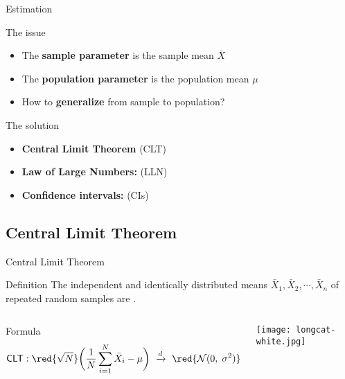 \documentclass[t]{beamer}
\begin{document}
	\begin{frame}[t]{Estimation}

		\begin{block}{The issue}
			\begin{itemize}
				\item The \textbf{sample parameter} %
					is the sample mean $\bar X$
				\item The \textbf{population parameter} %
					is the population mean $\mu$
				\item How to \textbf{generalize} %
					from sample to population?
			\end{itemize}
		\end{block}
		
		\begin{block}{The solution}
			\begin{itemize}
				\item \textbf{Central Limit Theorem} (CLT)
				\item \textbf{Law of Large Numbers:} (LLN)
				\item \textbf{Confidence intervals:} (CIs)
			\end{itemize}
		\end{block}
		
	\end{frame}

	\subsection{Central Limit Theorem}

	\begin{frame}[t]{Central Limit Theorem}

			\begin{block}{Definition}
				The independent %
				and identically distributed %
				means $\bar X_1, \bar X_2, \cdots, \bar X_n$ of %
				repeated random samples are %
				.
			\end{block}

			\begin{columns}[T]
		
					\begin{block}{Formula}
						$$\textsf{CLT}: \red{\sqrt{N}}\bigg(\frac{1}{N}\sum_{i=1}^N \bar X_i - \mu\bigg)\ \xrightarrow{d}\ \red{\mathcal{N}(0,\;\sigma^2)}$$
					\end{block}
		

				\vspace{1em}
				\begin{flushright}
					\texttt{[image: longcat-white.jpg]}		
				\end{flushright}
			\end{columns}
		
	\end{frame}
\end{document}
